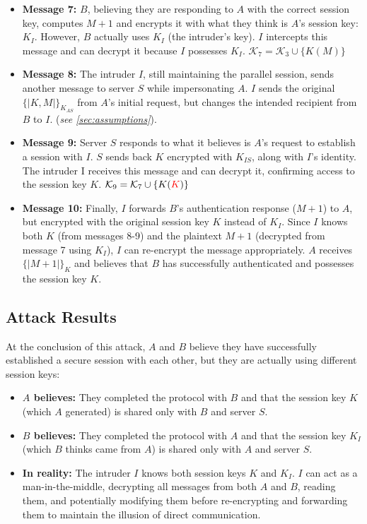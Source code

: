 \documentclass[11pt]{article}
\begin{document}
\begin{itemize}
        \item \textbf{Message 7:} $B$, believing they are responding to $A$ with the correct session key, computes
        $M + 1$ and encrypts it with what they think is $A$'s session key: $K_I$. However, $B$ actually uses $K_I$
        (the intruder's key). $I$ intercepts this message and can decrypt it because $I$ possesses $K_I$. $\mathcal{K}_7 = \mathcal{K}_3 \cup \{K(M)\}$

        \item \textbf{Message 8:} The intruder $I$, still maintaining the parallel session, sends another message to
        server $S$ while impersonating $A$. $I$ sends the original $\{| K, M |\}_{K_{AS}}$ from $A$'s initial request, but
        changes the intended recipient from $B$ to $I$. (\textit{see \ref{sec:assumptions}}).

        \item \textbf{Message 9:} Server $S$ responds to what it believes is $A$'s request to establish a session with
        $I$. $S$ sends back $K$ encrypted with $K_{IS}$, along with $I$'s identity. The intruder I receives this
        message and can decrypt it, confirming access to the session key $K$. $\mathcal{K}_9 = \mathcal{K}_7 \cup \{K(\textcolor{red}{K})\}$

        \item \textbf{Message 10:} Finally, $I$ forwards $B$'s authentication response ($M + 1$) to $A$, but encrypted
        with the original session key $K$ instead of $K_I$. Since $I$ knows both $K$ (from messages 8-9) and
        the plaintext $M + 1$ (decrypted from message 7 using $K_I$), $I$ can re-encrypt the message
        appropriately. $A$ receives $\{|M + 1|\}_{K}$ and believes that $B$ has successfully authenticated and
        possesses the session key $K$.

    \end{itemize}

    \subsection{Attack Results}

    At the conclusion of this attack, $A$ and $B$ believe they have successfully established a secure session with each other, but they are actually using different session keys:
    \begin{itemize}
        \item \textbf{$A$ believes:} They completed the protocol with $B$ and that the session key $K$ (which $A$ generated) is shared only with $B$ and server $S$.
        \item \textbf{$B$ believes:} They completed the protocol with $A$ and that the session key $K_I$ (which $B$ thinks came from $A$) is shared only with $A$ and server $S$.
        \item \textbf{In reality:} The intruder $I$ knows both session keys $K$ and $K_I$. $I$ can act as a man-in-the-middle, decrypting all messages from both $A$ and $B$, reading them, and potentially modifying them before re-encrypting and forwarding them to maintain the illusion of direct communication.
    \end{itemize}
\end{document}
